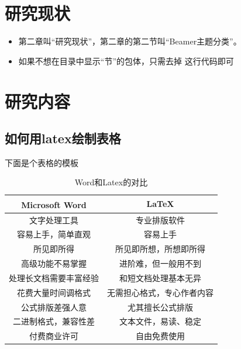 \documentclass{beamer}
\begin{document}
\section{研究现状}
\begin{frame}
    \begin{itemize}
        \item 第二章叫“研究现状”，第二章的第二节叫“Beamer主题分类”。
        \item 如果不想在目录中显示“节”的包体，只需去掉{} 这行代码即可       
    \end{itemize}
\end{frame}


\section{研究内容}
\subsection{如何用latex绘制表格}

\begin{frame}{下面是个表格的模板}
    \begin{table}[h]
        \centering
        \caption{Word和Latex的对比}
        \begin{tabular}{c|c}
        	            Microsoft\textsuperscript{\textregistered}  Word & \LaTeX \\
            \hline
            文字处理工具 & 专业排版软件 \\
            容易上手，简单直观 & 容易上手 \\
            所见即所得 & 所见即所想，所想即所得 \\
            高级功能不易掌握 & 进阶难，但一般用不到 \\
            处理长文档需要丰富经验 & 和短文档处理基本无异 \\
            花费大量时间调格式 & 无需担心格式，专心作者内容 \\
            公式排版差强人意 & 尤其擅长公式排版 \\
            二进制格式，兼容性差 & 文本文件，易读、稳定 \\
            付费商业许可 & 自由免费使用 \\
        \end{tabular}
    \end{table}
\end{frame}
\end{document}

